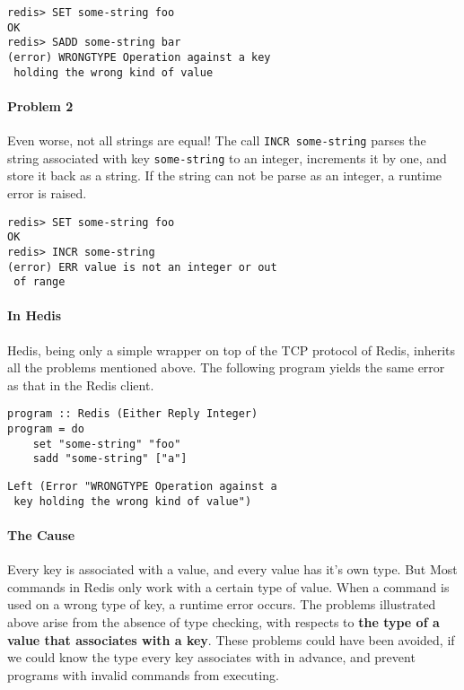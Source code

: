 \documentclass[pldi]{sigplanconf-pldi16}
\begin{document}
\begin{verbatim}
redis> SET some-string foo
OK
redis> SADD some-string bar
(error) WRONGTYPE Operation against a key
 holding the wrong kind of value
\end{verbatim}

\paragraph{Problem 2} Even worse, not all strings are equal!
The call \texttt{INCR some-string} parses the string
associated with key \texttt{some-string}
to an integer, increments it by one, and store it back as a string.
If the string can not be parse as an integer, a runtime error
is raised.

\begin{verbatim}
redis> SET some-string foo
OK
redis> INCR some-string
(error) ERR value is not an integer or out
 of range
\end{verbatim}

\paragraph{In Hedis} Hedis, being only a simple wrapper on top
of the TCP protocol of Redis, inherits all the problems mentioned
above. The following program yields the same error as that in
the Redis client.

\begin{verbatim}
program :: Redis (Either Reply Integer)
program = do
    set "some-string" "foo"
    sadd "some-string" ["a"]
\end{verbatim}
\begin{verbatim}
Left (Error "WRONGTYPE Operation against a
 key holding the wrong kind of value")
\end{verbatim}

\paragraph{The Cause} Every key is associated with a value, and every value has
 it's own type. But Most commands in Redis only work with a certain type of
 value. When a command is used on a wrong type of key, a runtime error occurs.
 The problems illustrated above arise from the absence of type checking, with
 respects to \textbf{the type of a value that associates with a key}.
 These problems could have been avoided, if we could know the type every key
 associates with in advance, and prevent programs with invalid commands from
 executing.
\end{document}
